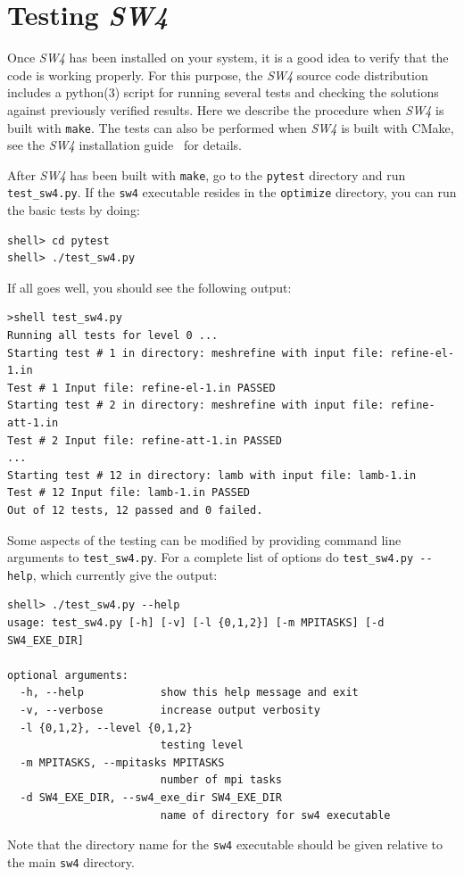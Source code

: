 \documentclass[11pt]{report}
\begin{document}
{\chapter{Testing \emph{SW4}}\label{cha:testing-sw4}

Once \emph{SW4} has been installed on your system, it is a good idea to verify that the code is
working properly. For this purpose, the \emph{SW4} source code distribution includes a python(3)
script for running several tests and checking the solutions against previously verified
results. Here we describe the procedure when \emph{SW4} is built with {\tt make}. The tests can also
be performed when \emph{SW4} is built with CMake, see the \emph{SW4} installation
guide~\cite{SW4-install} for details.

After \emph{SW4} has been built with \verb+make+, go to the \verb+pytest+ directory and run
\verb+test_sw4.py+. If the \verb+sw4+ executable resides in the \verb+optimize+ directory, you can
run the basic tests by doing:
\begin{verbatim}
shell> cd pytest
shell> ./test_sw4.py
\end{verbatim}
If all goes well, you should see the following output:
\begin{verbatim}
>shell test_sw4.py
Running all tests for level 0 ...
Starting test # 1 in directory: meshrefine with input file: refine-el-1.in
Test # 1 Input file: refine-el-1.in PASSED
Starting test # 2 in directory: meshrefine with input file: refine-att-1.in
Test # 2 Input file: refine-att-1.in PASSED
...
Starting test # 12 in directory: lamb with input file: lamb-1.in
Test # 12 Input file: lamb-1.in PASSED
Out of 12 tests, 12 passed and 0 failed.
\end{verbatim}
Some aspects of the testing can be modified by providing command line arguments to
\verb+test_sw4.py+. For a complete list of options do \verb+test_sw4.py --help+, which currently
give the output:
\begin{verbatim}
shell> ./test_sw4.py --help
usage: test_sw4.py [-h] [-v] [-l {0,1,2}] [-m MPITASKS] [-d SW4_EXE_DIR]

optional arguments:
  -h, --help            show this help message and exit
  -v, --verbose         increase output verbosity
  -l {0,1,2}, --level {0,1,2}
                        testing level
  -m MPITASKS, --mpitasks MPITASKS
                        number of mpi tasks
  -d SW4_EXE_DIR, --sw4_exe_dir SW4_EXE_DIR
                        name of directory for sw4 executable
\end{verbatim}
Note  that the directory name for the \verb+sw4+ executable should be given relative to the main
\verb+sw4+ directory.

}
\end{document}
